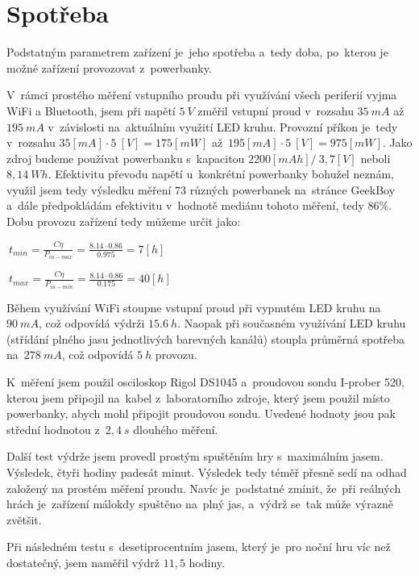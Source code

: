\section{Spotřeba}
Podstatným parametrem zařízení je~jeho spotřeba a~tedy doba, po~kterou je možné zařízení provozovat z~powerbanky.

V~rámci prostého měření vstupního proudu při využívání všech periferií vyjma WiFi a Bluetooth, jsem při napětí \(5~V\) změřil vstupní proud v~rozsahu \(35~mA\) až~\(195~mA\) v~závislosti na~aktuálním využití LED kruhu.
Provozní příkon je~tedy v~rozsahu \(35 [mA] \cdot 5~[V] = 175 [mW]\) až~\(195 [mA] \cdot 5~[V] = 975 [mW]\).
Jako zdroj budeme používat powerbanku s~kapacitou \(2200 [mAh] /~3,7 [V]\) neboli \(8,14~Wh\).
Efektivitu převodu napětí u~konkrétní powerbanky bohužel neznám, využil jsem tedy výsledku měření \(73\) různých powerbanek na~stránce GeekBoy \cite{TestPowerbank} a~dále předpokládám efektivitu v~hodnotě mediánu tohoto měření, tedy \(86\%\).
Dobu provozu zařízení tedy můžeme určit jako: 

\vspace{2mm}
\large
\(
 ~t_{min} = \frac{C \eta}{P_{in-max}} = \frac{8.14 \cdot 0.86}{0.975} = 7 [h]
\)

\(
 ~t_{max} = \frac{C \eta}{P_{in-min}} = \frac{8.14 \cdot 0.86}{0.175} = 40 [h]
\)
\normalsize
\vspace{2mm}

Během využívání WiFi stoupne vstupní proud při vypnutém LED kruhu na~\(90~mA\), což odpovídá výdrži \(15.6~h\).
Naopak při současném využívání LED kruhu (střídání plného jasu jednotlivých barevných kanálů) stoupla průměrná spotřeba na~\(278~mA\), což odpovídá \(5~h\) provozu.

K~měření jsem použil osciloskop Rigol DS1045 a~proudovou sondu I-prober 520, kterou jsem připojil na~kabel z~laboratorního zdroje, který jsem použil místo powerbanky, abych mohl připojit proudovou sondu.
Uvedené hodnoty jsou pak střední hodnotou z~\(2,4~s\) dlouhého měření.

Další test výdrže jsem provedl prostým spuštěním hry s~maximálním jasem.
Výsledek, čtyři hodiny padesát minut.
Výsledek tedy téměř přesně sedí na odhad založený na prostém měření proudu.
Navíc je~podstatné zmínit, že~při reálných hrách je~zařízení málokdy spuštěno na~plný jas, a~výdrž se~tak může výrazně zvětšit.

Při následném testu s~desetiprocentním jasem, který je~pro noční hru víc než dostatečný, jsem naměřil výdrž \(11,5\) hodiny.

